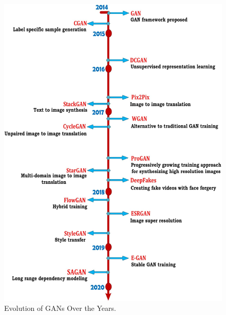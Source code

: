 \begin{figure}
        \begin{center}
 	    \includegraphics[scale=0.25]{images/relatedWorks/GANEvolution.jpg}
	    \caption[Evolution of \acp{GAN} Over the Years.]{Evolution of \acp{GAN} Over the Years\cite{PavanKumar.2021}.}
	    \label{fig:GANEvolution}
	    \end{center}
\end{figure}

